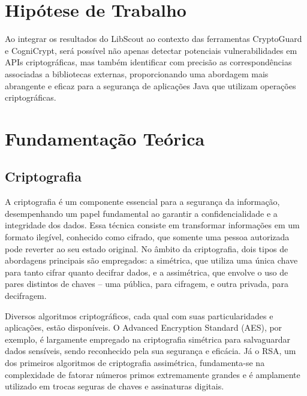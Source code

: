 \section{Hipótese de Trabalho}

Ao integrar os resultados do LibScout ao contexto das ferramentas CryptoGuard e CogniCrypt, será possível não apenas detectar potenciais vulnerabilidades em APIs criptográficas, mas também identificar com precisão as correspondências associadas a bibliotecas externas, proporcionando uma abordagem mais abrangente e eficaz para a segurança de aplicações Java que utilizam operações criptográficas.


\section{Fundamentação Teórica}

\subsection{Criptografia} %

A criptografia é um componente essencial para a segurança da informação, desempenhando um papel fundamental ao garantir a confidencialidade e a integridade dos dados. Essa técnica consiste em transformar informações em um formato ilegível, conhecido como cifrado, que somente uma pessoa autorizada pode reverter ao seu estado original. No âmbito da criptografia, dois tipos de abordagens principais são empregados: a simétrica, que utiliza uma única chave para tanto cifrar quanto decifrar dados, e a assimétrica, que envolve o uso de pares distintos de chaves – uma pública, para cifragem, e outra privada, para decifragem.

Diversos algoritmos criptográficos, cada qual com suas particularidades e aplicações, estão disponíveis. O Advanced Encryption Standard (AES), por exemplo, é largamente empregado na criptografia simétrica para salvaguardar dados sensíveis, sendo reconhecido pela sua segurança e eficácia. Já o RSA, um dos primeiros algoritmos de criptografia assimétrica, fundamenta-se na complexidade de fatorar números primos extremamente grandes e é amplamente utilizado em trocas seguras de chaves e assinaturas digitais.

